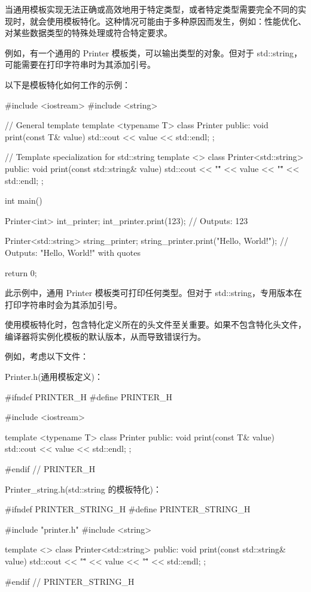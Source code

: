 当通用模板实现无法正确或高效地用于特定类型，或者特定类型需要完全不同的实现时，就会使用模板特化。这种情况可能由于多种原因而发生，例如：性能优化、对某些数据类型的特殊处理或符合特定要求。

例如，有一个通用的 Printer 模板类，可以输出类型的对象。但对于 std::string，可能需要在打印字符串时为其添加引号。


以下是模板特化如何工作的示例：

\begin{cpp}
#include <iostream>
#include <string>

// General template
template <typename T>
class Printer {
    public:
    void print(const T& value) {
        std::cout << value << std::endl;
    }
};

// Template specialization for std::string
template <>
class Printer<std::string> {
    public:
    void print(const std::string& value) {
        std::cout << "\"" << value << "\"" << std::endl;
    }
};

int main() {
    Printer<int> int_printer;
    int_printer.print(123); // Outputs: 123

    Printer<std::string> string_printer;
    string_printer.print("Hello, World!"); // Outputs: "Hello, World!" with quotes

    return 0;
}
\end{cpp}

此示例中，通用 Printer 模板类可打印任何类型。但对于 std::string，专用版本在打印字符串时会为其添加引号。


使用模板特化时，包含特化定义所在的头文件至关重要。如果不包含特化头文件，编译器将实例化模板的默认版本，从而导致错误行为。

例如，考虑以下文件：

Printer.h(通用模板定义)：

\begin{cpp}
#ifndef PRINTER_H
#define PRINTER_H

#include <iostream>

template <typename T>
class Printer {
    public:
    void print(const T& value) {
        std::cout << value << std::endl;
    }
};

#endif // PRINTER_H
\end{cpp}

Printer\_string.h(std::string 的模板特化)：

\begin{cpp}
#ifndef PRINTER_STRING_H
#define PRINTER_STRING_H

#include "printer.h"
#include <string>

template <>
class Printer<std::string> {
    public:
    void print(const std::string& value) {
        std::cout << "\"" << value << "\"" << std::endl;
    }
};

#endif // PRINTER_STRING_H
\end{cpp}

